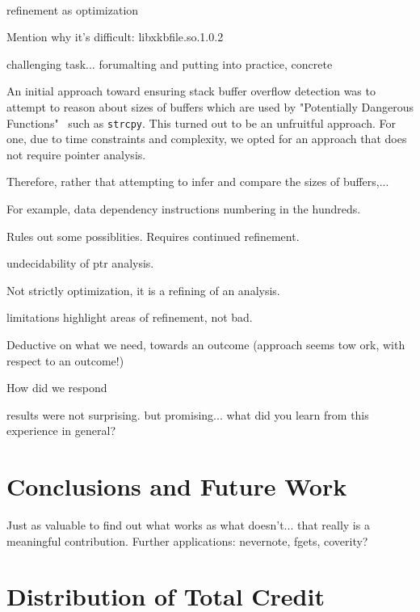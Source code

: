 \documentclass[letterpaper,11pt]{article}
\begin{document}
\paragraph{}

refinement as optimization

Mention why it's difficult: libxkbfile.so.1.0.2

challenging task... forumalting and putting into practice, concrete

An initial approach toward ensuring stack buffer overflow detection was to
attempt to reason about sizes of buffers which are used by "Potentially
Dangerous Functions"~\cite{seacord2008cert} such as \texttt{strcpy}. This
turned out to be an unfruitful approach. For one, due to time constraints and
complexity, we opted for an approach that does not require pointer analysis. 

Therefore, rather that attempting to infer and compare the sizes of buffers,...

For example, data dependency instructions numbering in the hundreds.


Rules out some possiblities. Requires continued refinement.

undecidability of ptr analysis. 


Not strictly optimization, it is a refining of an analysis.

limitations highlight areas of refinement, not bad.

Deductive on what we need, towards an outcome (approach seems tow ork,
with respect to an outcome!)

How did we respond

results were not surprising.
but promising...
what did you learn from this experience in general?



\section{Conclusions and Future Work}

Just as valuable to find out what works as what doesn't... that really
is a meaningful contribution. Further applications: nevernote, fgets, coverity?

\section{Distribution of Total Credit}

\clearpage
\end{document}
